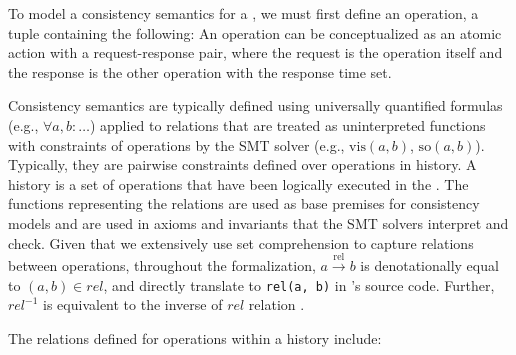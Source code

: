 To model a consistency semantics for a \sysmod{}, we must first define an
operation, a tuple containing the following:
An operation
can be conceptualized as an atomic action with a
request-response pair, where the request
is the operation itself and the response is the other operation with the
response time set.

Consistency semantics are typically defined using universally
quantified formulas
(e.g., $\forall a, b: \dots$) applied to relations that are treated
as uninterpreted
functions with constraints of operations by the SMT solver
(e.g., $\text{vis}(a, b)$, $\text{so}(a, b)$).
Typically, they are pairwise constraints defined over operations in history.
A history is a set of operations that have been logically executed in the
\sysmod{}.
The functions representing the relations are used as base premises
for consistency
models and are used in axioms and invariants that the SMT solvers
interpret and check. Given that we extensively use set comprehension to capture relations between operations, throughout the formalization, $a \xrightarrow{\text{rel}} b$ is denotationally equal to $(a, b) \in rel$, and directly translate to \texttt{rel(a, b)} in \sysname's source code.
Further, $rel^{-1}$ is equivalent to the inverse of $rel$ relation \cite{burckhardt2014principles,viotti2016consistency}.

The relations defined for operations within a history include:

